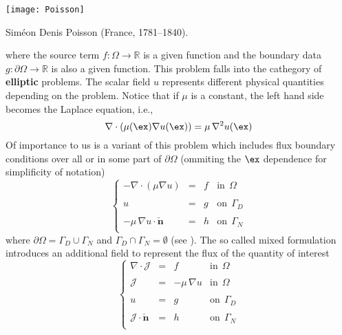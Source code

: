 \begin{marginfigure}[3.0cm]
	\texttt{[image: Poisson]}
	\caption[]{Sim\'eon Denis Poisson (France, 1781--1840).} 
\end{marginfigure}
where the source term $f:\Omega \rightarrow \mathbb{R}$ is a given function and
the boundary data $g:\partial{\Omega} \rightarrow \mathbb{R}$ is also a given
function. This problem falls into the cathegory of \textbf{elliptic} problems. 
The scalar field $u$ represents different physical quantities
depending on the problem. Notice that if $\mu$ is a constant, the left
hand side becomes the Laplace equation, i.e.,
\begin{equation}
\nabla \cdot \left ( \mu(\ex) \nabla{u}(\ex) \right) = \mu \, \nabla^2u(\ex)
\end{equation}
Of importance to us is a variant of this problem which includes flux boundary
conditions over all or in some part of $\partial{\Omega}$ (ommiting the
$\ex$ dependence for simplificity of notation)
\begin{equation}
\left \{
\begin{array}{rcll}
-\nabla \cdot \left ( \mu \nabla{u} \right) & = & f & \mbox{in}~~\Omega \\
& & & \\
u & = & g & \mbox{on}~~\Gamma_D \\
& & & \\
-\mu\,\nabla{u}\cdot \check{\mathbf{n}} & = & h & \mbox{on}~~\Gamma_N \\
\end{array}
\right.
\end{equation}
where $\partial{\Omega} = \Gamma_D \cup \Gamma_N$ and $\Gamma_D \cap \Gamma_N = \emptyset$
(see ).
The so called mixed formulation introduces an additional field to represent
the flux of the quantity of interest
\begin{equation}
\left \{
\begin{array}{rcll}
\nabla \cdot \boldsymbol{\mathcal{J}} & = & f & \mbox{in}~~\Omega \\
& & & \\
\boldsymbol{\mathcal{J}} & = & -\mu\,\nabla{u} & \mbox{in}~~\Omega \\
& & & \\
u & = & g & \mbox{on}~~\Gamma_D \\
& & & \\
\boldsymbol{\mathcal{J}} \cdot \check{\mathbf{n}} & = & h & \mbox{on}~~\Gamma_N \\
\end{array}
\right.
\end{equation}
